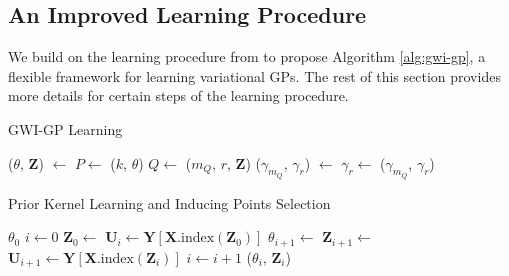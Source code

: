 \documentclass{article}
\numberwithin{equation}{section}
\begin{document}
\subsection{An Improved Learning Procedure}
We build on the learning procedure from \cite{wild2022generalized} to propose Algorithm \ref{alg:gwi-gp}, a flexible framework for learning variational GPs.
The rest of this section provides more details for certain steps of the learning procedure.
\begin{algorithm}[h!]
\caption{GWI-GP Learning}\label{alg:gwi-gp}
\begin{algorithmic}
     
    \State ($\theta$, $\mathbf{Z}$) $\leftarrow$  
    \State $P \leftarrow$ ($k$, $\theta$) 
    \State $Q \leftarrow$ ($m_Q$, $r$, $\mathbf{Z}$) 
    \State ($\gamma_{m_Q}$, $\gamma_r$) $\leftarrow$  
    \State $\gamma_r \leftarrow$  
    \State \Return ($\gamma_{m_Q}$, $\gamma_r$)
\end{algorithmic}
\end{algorithm}

\begin{algorithm}[h!]
\caption{Prior Kernel Learning and Inducing Points Selection}\label{alg:inducing-points-prior-gp}
\begin{algorithmic}
\Require $\theta_0$ 
 \State $i \leftarrow 0$
  \State $\mathbf{Z}_0 \leftarrow$  
  \State $\mathbf{U}_i \leftarrow \mathbf{Y}\left[\mathbf{X}.\text{index}\left(\mathbf{Z}_0\right)\right]$ 
\State $\theta_{i+1} \leftarrow$  
\State $\mathbf{Z}_{i+1} \leftarrow$ 
\State $\mathbf{U}_{i+1} \leftarrow \mathbf{Y}\left[\mathbf{X}.\text{index}\left(\mathbf{Z}_i\right)\right]$
\State $i \leftarrow i+1$
\EndWhile
\State \Return ($\theta_i$, $\mathbf{Z}_i$)
\end{algorithmic}
\end{algorithm}
\end{document}

